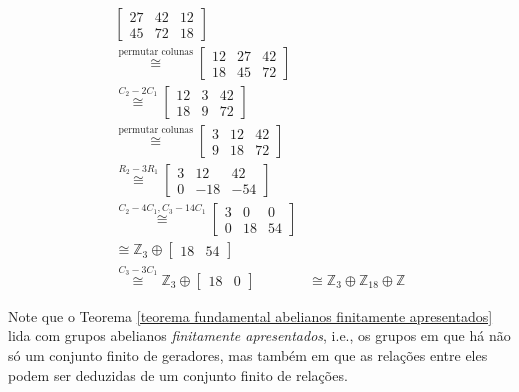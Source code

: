 \begin{align*}
\begin{bmatrix}
        	27 & 42 & 12 \\
        	45 & 72 & 18
        	\end{bmatrix}& \\ \stackrel{\text{permutar colunas}}{\cong}
        	\begin{bmatrix}
        	12 & 27 & 42 \\
        	18 & 45 & 72
        	\end{bmatrix}& \\ \stackrel{C_2 - 2C_1}{\cong}
        	\begin{bmatrix}
        	12 & 3 & 42 \\
        	18 & 9 & 72
        	\end{bmatrix}& \\ \stackrel{\text{permutar colunas}}{\cong}
        	\begin{bmatrix}
        	3 & 12 & 42 \\
        	9 & 18 & 72
        	\end{bmatrix}& \\ \stackrel{R_2 - 3R_1}{\cong}
        	\begin{bmatrix}
        	3 & 12 & 42 \\
        	0 & -18 & -54
        	\end{bmatrix}& \\ \stackrel{C_2 - 4C_1, C_3 - 14C_1}{\cong}
        	\begin{bmatrix}
        	3 & 0 & 0 \\
        	0 & 18 & 54
        	\end{bmatrix}& \\ \stackrel{}{\cong}
        	\mathbb{Z}_3\oplus\begin{bmatrix}
        	18 & 54
        	\end{bmatrix}& \\ \stackrel{C_3 - 3C_1}{\cong}
        	\mathbb{Z}_3\oplus\begin{bmatrix}
        	18 & 0
        	\end{bmatrix}& \cong \mathbb{Z}_3\oplus\mathbb{Z}_{18}\oplus\mathbb{Z}
    	\end{align*}
    	\par\vspace{0.3cm} Note que o Teorema \eqref{teorema fundamental abelianos finitamente apresentados} 
    	lida com grupos abelianos \textit{finitamente apresentados}, i.e., os grupos em que há não só um 
    	conjunto finito de geradores, mas também em que as relações entre eles podem ser deduzidas de um 
    	conjunto finito de relações.
    	
